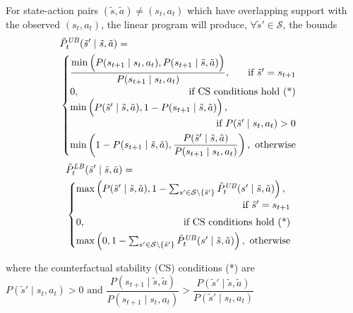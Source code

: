 \begin{theorem}
\label{theorem:ub overlapping}
For state-action pairs $(\tilde{s}, \tilde{a})\neq (s_t, a_t)$ which have overlapping support with the observed $(s_t, a_t)$, the linear program will produce, $\forall \tilde{s}' \in \mathcal{S}$, the bounds
\[
\begin{aligned}
&\tilde{P}_{t}^{\it UB}(\tilde{s}' \mid \tilde{s}, \tilde{a}) =\\
&\begin{cases}
\dfrac{\min\left(\begin{array}{@{}c@{}} P(s_{t+1} \mid s_t, a_t), P(s_{t+1} \mid \tilde{s}, \tilde{a}) \end{array}\right)}{P(s_{t+1} \mid s_t, a_t)}, \hfill \textnormal{if $\tilde{s}' = s_{t+1}$}\\[3pt]
0, \hfill \textnormal{ if CS conditions hold (*)}\\%
\min\left(\begin{array}{@{}c@{}} P(\tilde{s}' \mid \tilde{s}, \tilde{a}), 1 - P(s_{t+1} \mid \tilde{s}, \tilde{a}) \end{array}\right), \\ \hfill \textnormal{ if $P({\tilde{s}' \mid s_t, a_t}) > 0$}\\[3pt]
\min\left(\begin{array}{@{}c@{}} 1 - P(s_{t+1} \mid \tilde{s}, \tilde{a}), \dfrac{P(\tilde{s}' \mid \tilde{s}, \tilde{a})}{P(s_{t+1} \mid s_t, a_t)} \end{array}\right), \textnormal{ otherwise}\\
\end{cases}
\end{aligned}
\]
{
\[
\begin{aligned}
&\tilde{P}_{t}^{\it LB}(\tilde{s}' \mid \tilde{s}, \tilde{a}) = \\
&\begin{cases}
\max\left(P(\tilde{s}' \mid \tilde{s}, \tilde{a}), 1 - \sum_{s' \in \mathcal{S}\setminus\{\tilde{s}'\}}{\tilde{P}_{t}^{\it UB}(s' \mid \tilde{s}, \tilde{a})}\right), \\
\hfill \textnormal{if $\tilde{s}'= s_{t+1}$}\\[3pt]
0, \hfill \textnormal{ if CS conditions hold (*)}\\[3pt]
\max\left(0, 1 - \sum_{s' \in \mathcal{S}\setminus\{\tilde{s}'\}}{\tilde{P}_{t}^{\it UB}(s' \mid \tilde{s}, \tilde{a})}\right), \textnormal{ otherwise}
\end{cases}
\end{aligned}
\]
}
\end{theorem}
where the counterfactual stability (CS) conditions (*) are $P({\tilde{s}' \mid s_t, a_t}) > 0 \text{ and } \dfrac{P(s_{t+1} \mid \tilde{s}, \tilde{a})}{P(s_{t+1} \mid s_t, a_t)} > \dfrac{P(\tilde{s}' \mid \tilde{s}, \tilde{a})}{P({\tilde{s}' \mid s_t, a_t})}$
